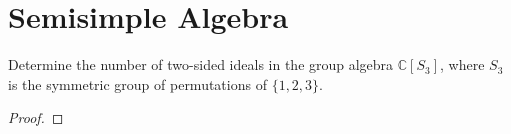 


\chapter{Semisimple Algebra}




\begin{prob}[F2019-Q5]
    Determine the number of two-sided ideals in the group algebra \(\mathbb{C}[S_3]\), where \(S_3\) is the symmetric group of permutations of \(\{1, 2, 3\}\).
\end{prob}
\begin{proof}
    
\end{proof}



